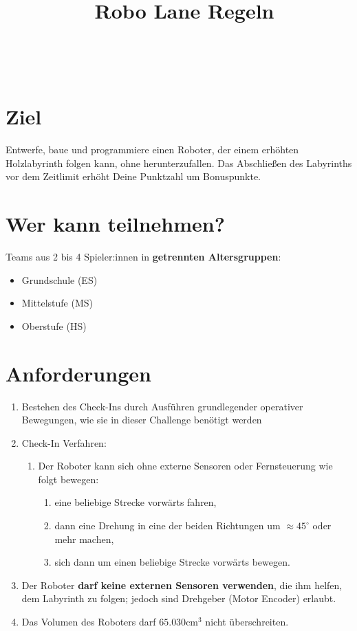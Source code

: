 \documentclass[a4paper,12pt]{article}
\begin{document}



\title{\tagYear\ Robo Lane Regeln} 

\makeatletter
\let\inserttitle\@title
\makeatother
\begin{center}
	\rrgerLogo
	\huge                      %
	\bfseries                   %
	\\
	\inserttitle
\end{center}
\section{Ziel}
Entwerfe, baue und programmiere einen Roboter, der einem erhöhten Holzlabyrinth
folgen kann, ohne herunterzufallen. Das Abschließen des Labyrinths vor dem
Zeitlimit erhöht Deine Punktzahl um Bonuspunkte.

\section{Wer kann teilnehmen?}
Teams aus 2 bis 4 Spieler:innen in \textbf{getrennten Altersgruppen}:

\begin{itemize}
	\item Grundschule (ES)
	\item Mittelstufe (MS)
	\item Oberstufe (HS)
\end{itemize}
\combineDivisions

\section{Anforderungen}
\robotRequirements
\begin{enumerate}
	\item Bestehen des Check-Ins durch Ausführen grundlegender operativer
		Bewegungen, wie sie in dieser Challenge benötigt werden
	\item Check-In Verfahren:
	\begin{enumerate}
		\item Der Roboter kann sich ohne externe Sensoren oder
			Fernsteuerung wie folgt bewegen:
		\begin{enumerate}
			\item eine beliebige Strecke vorwärts fahren,
			\item dann eine Drehung in eine der beiden Richtungen
				um $\approx 45^{\circ}$ oder mehr machen,
			\item sich dann um einen beliebige Strecke vorwärts
				bewegen.
		\end{enumerate}
	\end{enumerate}
	\item Der Roboter \textbf{darf keine externen Sensoren verwenden}, die
		ihm helfen, dem Labyrinth zu folgen; jedoch sind Drehgeber
		(Motor Encoder) erlaubt.
	\item Das Volumen des Roboters darf $65{.}030 \mathrm{cm}^{3}$ nicht überschreiten.
\end{enumerate}
\end{document}
